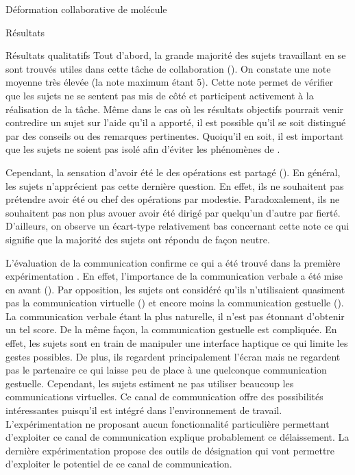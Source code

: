 \documentclass[myfrancais]{mythesis}
\begin{document}
\begin{mychapter}{Déformation collaborative de molécule}
\begin{mysection}{Résultats}
\begin{mysubsection}{Résultats qualitatifs}
				Tout d'abord, la grande majorité des sujets travaillant en  se sont trouvés utiles dans cette tâche de collaboration ().
				On constate une note moyenne très élevée (la note maximum étant 5).
				Cette note permet de vérifier que les sujets ne se sentent pas mis de côté et participent activement à la réalisation de la tâche.
				Même dans le cas où les résultats objectifs pourrait venir contredire un sujet sur l'aide qu'il a apporté, il est possible qu'il se soit distingué par des conseils ou des remarques pertinentes.
				Quoiqu'il en soit, il est important que les sujets ne soient pas isolé afin d'éviter les phénomènes de .

				Cependant, la sensation d'avoir été le  des opérations est partagé ().
				En général, les sujets n'apprécient pas cette dernière question.
				En effet, ils ne souhaitent pas prétendre avoir été  ou chef des opérations par modestie.
				Paradoxalement, ils ne souhaitent pas non plus avouer avoir été dirigé par quelqu'un d'autre par fierté.
				D'ailleurs, on observe un écart-type relativement bas concernant cette note ce qui signifie que la majorité des sujets ont répondu de façon neutre.

				L'évaluation de la communication confirme ce qui a été trouvé dans la première expérimentation .
				En effet, l'importance de la communication verbale a été mise en avant ().
				Par opposition, les sujets ont considéré qu'ils n'utilisaient quasiment pas la communication virtuelle () et encore moins la communication gestuelle ().
				La communication verbale étant la plus naturelle, il n'est pas étonnant d'obtenir un tel score.
				De la même façon, la communication gestuelle est compliquée.
				En effet, les sujets sont en train de manipuler une interface haptique ce qui limite les gestes possibles.
				De plus, ils regardent principalement l'écran mais ne regardent pas le partenaire ce qui laisse peu de place à une quelconque communication gestuelle.
				Cependant, les sujets estiment ne pas utiliser beaucoup les communications virtuelles.
				Ce canal de communication offre des possibilités intéressantes puisqu'il est intégré dans l'environnement de travail.
				L'expérimentation ne proposant aucun fonctionnalité particulière permettant d'exploiter ce canal de communication explique probablement ce délaissement.
				La dernière expérimentation  propose des outils de désignation qui vont permettre d'exploiter le potentiel de ce canal de communication.


\end{mysubsection}
\end{mysection}
\end{mychapter}
\end{document}
